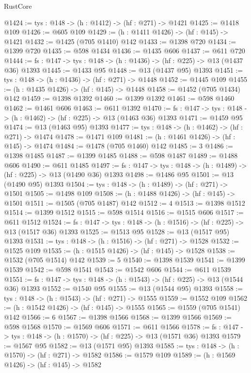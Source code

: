 \begin{lexlean}{RustCore}
\begin{coremodule}
{\begin{coremodule}
{{{@1424 := {tys : @148} -> (h : @1412) -> (hf : @271) -> @1421
@1425 := @1418 @109
@1426 := @605 @109
@1429 := (h : @1411 @1426) -> (hf : @145) -> @1421
@1432 := @1425 (@705 @1410) @142
@1433 := @1398 @720
@1434 := @1399 @720
@1435 := @598 @1434
@1436 := @1435 @606
@1437 := @611 @720
@1444 := {fs : @147} -> {tys : @148} -> (h : @1436) -> (hf : @225) -> @13 (@1437 @36) @1393
@1445 := @1433 @95
@1448 := @13 (@1437 @95) @1393
@1451 := {tys : @148} -> (h : @1436) -> (hf : @271) -> @1448
@1452 := @1445 @109
@1455 := (h : @1435 @1426) -> (hf : @145) -> @1448
@1458 := @1452 (@705 @1434) @142
@1459 := @1398 @1392
@1460 := @1399 @1392
@1461 := @598 @1460
@1462 := @1461 @606
@1463 := @611 @1392
@1470 := {fs : @147} -> {tys : @148} -> (h : @1462) -> (hf : @225) -> @13 (@1463 @36) @1393
@1471 := @1459 @95
@1474 := @13 (@1463 @95) @1393
@1477 := {tys : @148} -> (h : @1462) -> (hf : @271) -> @1474
@1478 := @1471 @109
@1481 := (h : @1461 @1426) -> (hf : @145) -> @1474
@1484 := @1478 (@705 @1460) @142
@1485 := 3
@1486 := @1398 @1485
@1487 := @1399 @1485
@1488 := @598 @1487
@1489 := @1488 @606
@1490 := @611 @1485
@1497 := {fs : @147} -> {tys : @148} -> (h : @1489) -> (hf : @225) -> @13 (@1490 @36) @1393
@1498 := @1486 @95
@1501 := @13 (@1490 @95) @1393
@1504 := {tys : @148} -> (h : @1489) -> (hf : @271) -> @1501
@1505 := @1498 @109
@1508 := (h : @1488 @1426) -> (hf : @145) -> @1501
@1511 := @1505 (@705 @1487) @142
@1512 := 4
@1513 := @1398 @1512
@1514 := @1399 @1512
@1515 := @598 @1514
@1516 := @1515 @606
@1517 := @611 @1512
@1524 := {fs : @147} -> {tys : @148} -> (h : @1516) -> (hf : @225) -> @13 (@1517 @36) @1393
@1525 := @1513 @95
@1528 := @13 (@1517 @95) @1393
@1531 := {tys : @148} -> (h : @1516) -> (hf : @271) -> @1528
@1532 := @1525 @109
@1535 := (h : @1515 @1426) -> (hf : @145) -> @1528
@1538 := @1532 (@705 @1514) @142
@1539 := 5
@1540 := @1398 @1539
@1541 := @1399 @1539
@1542 := @598 @1541
@1543 := @1542 @606
@1544 := @611 @1539
@1551 := {fs : @147} -> {tys : @148} -> (h : @1543) -> (hf : @225) -> @13 (@1544 @36) @1393
@1552 := @1540 @95
@1555 := @13 (@1544 @95) @1393
@1558 := {tys : @148} -> (h : @1543) -> (hf : @271) -> @1555
@1559 := @1552 @109
@1562 := (h : @1542 @1426) -> (hf : @145) -> @1555
@1565 := @1559 (@705 @1541) @142
@1566 := 6
@1567 := @1398 @1566
@1568 := @1399 @1566
@1569 := @598 @1568
@1570 := @1569 @606
@1571 := @611 @1566
@1578 := {fs : @147} -> {tys : @148} -> (h : @1570) -> (hf : @225) -> @13 (@1571 @36) @1393
@1579 := @1567 @95
@1582 := @13 (@1571 @95) @1393
@1585 := {tys : @148} -> (h : @1570) -> (hf : @271) -> @1582
@1586 := @1579 @109
@1589 := (h : @1569 @1426) -> (hf : @145) -> @1582
}}}
\end{coremodule}}
\end{coremodule}
\end{lexlean}
